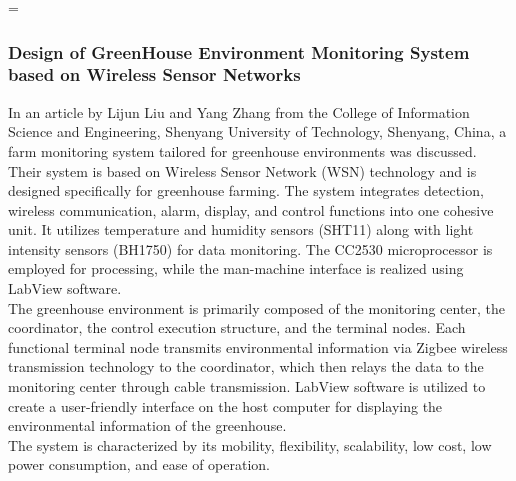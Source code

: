 =\documentclass[12pt, a4paper]{article}
\begin{document}
\subsubsection{Design of GreenHouse Environment Monitoring System based on Wireless Sensor Networks}
In an article by Lijun Liu and Yang Zhang \cite{liu2017design} from the College of Information Science and Engineering, Shenyang University of Technology, Shenyang, China, a farm monitoring system tailored for greenhouse environments was discussed.\\
Their system is based on Wireless Sensor Network (WSN) technology and is designed specifically for greenhouse farming. The system integrates detection, wireless communication, alarm, display, and control functions into one cohesive unit. It utilizes temperature and humidity sensors (SHT11) along with light intensity sensors (BH1750) for data monitoring. The CC2530 microprocessor is employed for processing, while the man-machine interface is realized using LabView software.\\
The greenhouse environment is primarily composed of the monitoring center, the coordinator, the control execution structure, and the terminal nodes. Each functional terminal node transmits environmental information via Zigbee wireless transmission technology to the coordinator, which then relays the data to the monitoring center through cable transmission. LabView software is utilized to create a user-friendly interface on the host computer for displaying the environmental information of the greenhouse.\\
The system is characterized by its mobility, flexibility, scalability, low cost, low power consumption, and ease of operation.
\end{document}
